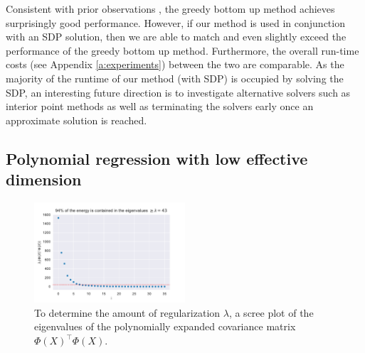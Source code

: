 Consistent with prior observations
\cite{chamon2017approximate,tractable-experimental-design}, the greedy bottom up
method achieves surprisingly good performance. However, if our method is used
in conjunction with an SDP solution, then we are able to match and
even slightly exceed the performance of the greedy bottom up
method. Furthermore, the overall run-time costs (see Appendix \ref{a:experiments})
between the two are comparable. As the majority of the runtime of our
method (with SDP) is occupied by solving the SDP, an interesting future direction
is to investigate alternative solvers such as interior point methods as well
as terminating the solvers early once an approximate solution is reached.


\subsection{Polynomial regression with low effective dimension}

\begin{figure}[htbp]
    \centering
    \includegraphics[width=0.5\textwidth]{Figures/screeplot.pdf}
    \caption{
        To determine the amount of regularization $\lambda$, a scree
        plot of the eigenvalues of the polynomially expanded
        covariance matrix $\Phi(X)^\top \Phi(X)$.
    }
    \label{fig:scree}
\end{figure}

